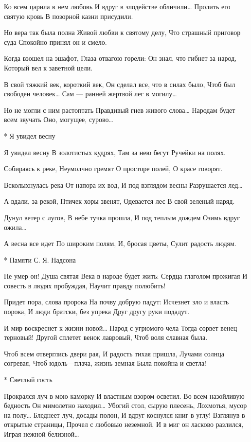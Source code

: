 Ко всем царила в нем любовь
И вдруг в злодействе обличили…
Пролить его святую кровь
В позорной казни присудили.

Но вера так была полна
Живой любви к святому делу,
Что страшный приговор суда
Спокойно принял он и смело.

Когда взошел на эшафот,
Глаза отвагою горели:
Он знал, что гибнет за народ,
Который вел к заветной цели.

В свой тяжкий век, короткий век,
Он сделал все, что в силах было,
Чтоб был свободен человек…
Сам — ранней жертвой лег в могилу…

Но не могли с ним растоптать
Правдивый гнев живого слова…
Народам будет всем звучать
Оно, могущее, сурово…


* Я увидел весну

Я увидел весну
В золотистых кудрях,
Там за нею бегут
Ручейки на полях.

Собираясь к реке,
Неумолчно гремят
О просторе полей,
О красе говорят.

Всколыхнулась река
От напора их вод,
И под взглядом весны
Разрушается лед…

А вдали, за рекой,
Птичек хоры звенят,
Одевается лес
В свой зеленый наряд.

Дунул ветер с лугов,
В небе тучка прошла,
И под теплым дождем
Озимь вдруг ожила…

А весна все идет
По широким полям,
И, бросая цветы,
Сулит радость людям.


* Памяти С. Я. Надсона

Не умер он! Душа святая
Века в народе будет жить:
Сердца глаголом прожигая
И совесть в людях пробуждая,
Научит правду полюбить!

Придет пора, слова пророка
На почву добрую падут:
Исчезнет зло и власть порока,
И люди братски, без упрека
Друг другу руки подадут.

И мир воскреснет к жизни новой…
Народ с угрюмого чела
Тогда сорвет венец терновый!
Другой сплетет венок лавровый,
Чтоб воля славная была.

Чтоб всем отверглись двери рая,
И радость тихая пришла,
Лучами солнца согревая,
Чтоб юдоль—плача, жизнь земная
Была покойна и светла!


* Светлый гость

Прокрался луч в мою каморку
И властным взором осветил.
Во всем назойливую бедность
Он мимолетно находил…
Убогий стол, сырую плесень,
Лохмотья, мусор на полу…
Бледнеет луч, досады полон,
И вдруг коснулся книг в углу!
Взглянув в открытые страницы,
Прочел с любовью неземной,
И в миг он ласково разлился,
Играя нежной белизной…


